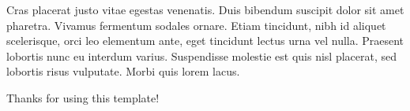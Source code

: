 \documentclass{article}
\begin{document}
\vspace{0.5cm}
Cras placerat justo vitae egestas venenatis. Duis bibendum suscipit dolor sit amet pharetra. Vivamus fermentum sodales ornare. Etiam tincidunt, nibh id aliquet scelerisque, orci leo elementum ante, eget tincidunt lectus urna vel nulla. Praesent lobortis nunc eu interdum varius. Suspendisse molestie est quis nisl placerat, sed lobortis risus vulputate. Morbi quis lorem lacus.

\vspace{1cm}
Thanks for using this template!
\end{document}
